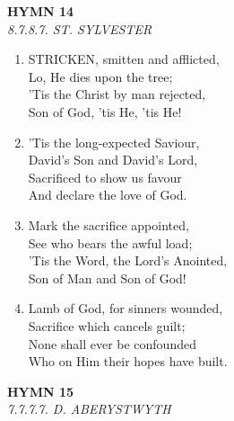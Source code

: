\newpage
\begin{center}
    {\Large \textbf{HYMN 14}}
    \\
    \textit{8.7.8.7. ST. SYLVESTER}
\end{center}
\vspace{1em}

\begin{enumerate}
    \item STRICKEN, smitten and afflicted, \\
        Lo, He dies upon the tree; \\
        'Tis the Christ by man rejected, \\
        Son of God, 'tis He, 'tis He!

    \item 'Tis the long-expected Saviour, \\
        David's Son and David's Lord, \\
        Sacrificed to show us favour \\
        And declare the love of God.

    \item Mark the sacrifice appointed, \\
        See who bears the awful load; \\
        'Tis the Word, the Lord's Anointed, \\
        Son of Man and Son of God!

    \item Lamb of God, for sinners wounded, \\
        Sacrifice which cancels guilt; \\
        None shall ever be confounded \\
        Who on Him their hopes have built.

\end{enumerate}

\newpage
\begin{center}
    {\Large \textbf{HYMN 15}}
    \\
    \textit{7.7.7.7. D. ABERYSTWYTH}
\end{center}
\vspace{1em}

